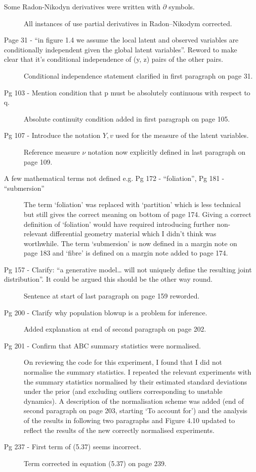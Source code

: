 \documentclass[10pt,a4paper]{article}
\begin{document}
\begin{description}
\item[
  Some Radon-Nikodyn derivatives were written with \(\partial\) symbols.]
  All instances of use partial derivatives in Radon--Nikodym corrected.
\item[
  Page 31 - ``in figure 1.4 we assume the local latent and observed
  variables are conditionally independent given the global latent
  variables''. Reword to make clear that it's conditional independence
  of (y, z) pairs of the other pairs.]
  Conditional independence statement clarified in first paragraph on page 31.
\item[
  Pg 103 - Mention condition that p must be absolutely continuous with
  respect to q.]
  Absolute continuity condition added in first paragraph on page 105.
\item[
  Pg 107 - Introduce the notation \(Y, v\) used for the measure of the
  latent variables.]
  Reference measure $\nu$ notation now explicitly defined in last paragraph on page 109.
\item[
  A few mathematical terms not defined e.g. Pg 172 - ``foliation'', Pg 181 - ``submersion''
  ]
  The term `foliation' was replaced with `partition' which is less technical but still gives the correct meaning on bottom of page 174. Giving a correct definition of `foliation' would have required introducing further non-relevant differential geometry material which I didn't think was worthwhile. The term `submersion' is now defined in a margin note on page 183 and `fibre' is defined on a margin note added to page 174.
\item[
  Pg 157 - Clarify: ``a generative model\ldots{} will not uniquely
  define the resulting joint distribution''. It could be argued this
  should be the other way round.]
  Sentence at start of last paragraph on page 159 reworded.
\item[
  Pg 200 - Clarify why population blowup is a problem for inference.]
  Added explanation at end of second paragraph on page 202.
\item[
  Pg 201 - Confirm that ABC summary statistics were normalised.]
  On reviewing the code for this experiment, I found that I did not normalise the summary statistics. I repeated the relevant experiments with the summary statistics normalised by their estimated standard deviations under the prior (and excluding outliers corresponding to unstable dynamics). A description of the normalisation scheme was added (end of second paragraph on page 203, starting `To account for') and the analysis of the results in following two paragraphs and Figure 4.10 updated to reflect the results of the new correctly normalised experiments.
\item[
  Pg 237 - First term of (5.37) seems incorrect.]
  Term corrected in equation (5.37) on page 239.
\end{description}
\end{document}
